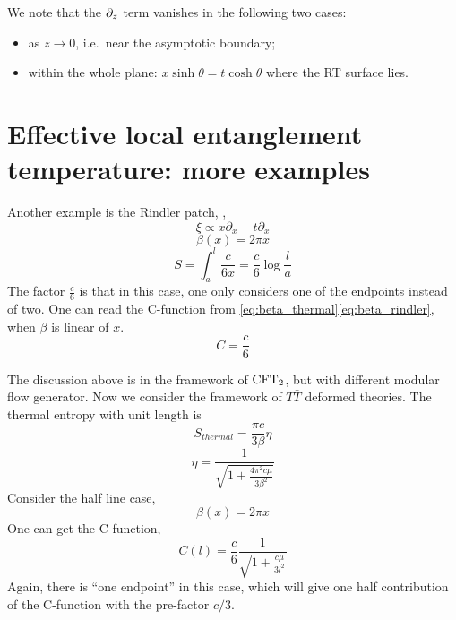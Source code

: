 \documentclass[11pt,a4paper,utf8]{article}
\newcommand{\TTbar}{\ensuremath{T\bar{T}}\xspace}
\begin{document}
	We note that the $\partial_{z}$ term vanishes in the following two cases:
	\begin{itemize}%
	\item as $z\to 0$, i.e.~near the asymptotic boundary;
	\item within the whole plane: $
			x\sinh\theta
			= t\cosh\theta
		$ where the RT surface lies. 
	\end{itemize}

\section{Effective local entanglement temperature: more examples}
	
	Another example is the Rindler patch, ,
	\begin{equation}
	\xi\propto x\partial_x-t\partial_x
	\end{equation}
	\begin{equation}
	\beta(x)=2\pi x
	\label{eq:beta_rindler}
	\end{equation}
	\begin{equation}
	S=\int_{a}^{l}\frac{c}{6x}=\frac{c}{6}\log \frac{l}{a}
	\end{equation}
	The factor $\frac{c}{6}$ is that in this case, one only considers one of the endpoints instead of two. One can read the C-function from \eqref{eq:beta_thermal}\eqref{eq:beta_rindler}, when $\beta$ is linear of $x$.
	\begin{equation}
	C=\frac{c}{6}
	\end{equation}
	
	The discussion above is in the framework of $\mathrm{CFT}_2$, but with different modular flow generator. Now we consider the framework of \TTbar deformed theories. The thermal entropy with unit length is
	\begin{equation}
	S_{thermal}=\frac{\pi c}{3\beta}\eta
	\end{equation}
	\begin{equation}
	\eta=\frac{1}{\sqrt{1+\frac{4\pi^2c\mu}{3\beta^2}}}
	\end{equation}
	Consider the half line case,
	\begin{equation}
	\beta(x)=2\pi x
	\end{equation}
	One can get the C-function,
	\begin{equation}
	C(l)=\frac{c}{6}\frac{1}{\sqrt{1+\frac{c\mu}{3l^2}}}
	\end{equation}
	Again, there is ``one endpoint'' in this case, which will give one half contribution of the C-function with the pre-factor $c/3$.
	
	
	
	
	


\FloatBarrier

\pagebreak

 





\end{document}
